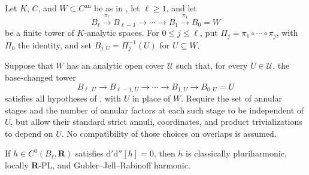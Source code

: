 \begin{corollary}
\label{cor:p062-curve-local-annular-mixed-bundle-towers}
Let $K$, $C$, and $W\subset C^{\mathrm{an}}$ be as in
, let $\ell\geq1$, and let
\[
 B_\ell\xrightarrow{\pi_\ell}B_{\ell-1}
 \longrightarrow\cdots\longrightarrow B_1
 \xrightarrow{\pi_1}B_0=W
\]
be a finite tower of $K$-analytic spaces.  For $0\leq j\leq\ell$, put
$\Pi_j=\pi_1\circ\cdots\circ\pi_j$, with $\Pi_0$ the identity, and set
$B_{j,U}=\Pi_j^{-1}(U)$ for $U\subseteq W$.

Suppose that $W$ has an analytic open cover $\mathcal U$ such that, for
every $U\in\mathcal U$, the base-changed tower
\[
 B_{\ell,U}\longrightarrow B_{\ell-1,U}
 \longrightarrow\cdots\longrightarrow B_{1,U}
 \longrightarrow B_{0,U}=U
\]
satisfies all hypotheses of
, with $U$ in
place of $W$.  Require the set of annular stages and the number of annular
factors at each such stage to be independent of $U$, but allow their
standard strict annuli, coordinates, and product trivializations to depend
on $U$.  No compatibility of those choices on overlaps is assumed.

If $h\in C^0(B_\ell,\mathbf R)$ satisfies
$\mathrm d'\mathrm d''[h]=0$, then $h$ is classically pluriharmonic,
locally $\mathbf R$-PL, and Gubler--Jell--Rabinoff harmonic.
\end{corollary}
